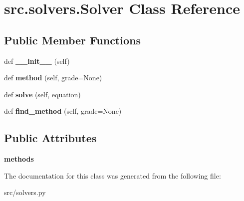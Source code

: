 \hypertarget{classsrc_1_1solvers_1_1Solver}{}\section{src.\+solvers.\+Solver Class Reference}
\label{classsrc_1_1solvers_1_1Solver}
\subsection*{Public Member Functions}
\begin{DoxyCompactItemize}
\item 
\mbox{\label{classsrc_1_1solvers_1_1Solver_a5415ed6863748bdccd46e474367577dd}} 
def {\bfseries \+\_\+\+\_\+init\+\_\+\+\_\+} (self)
\item 
\mbox{\label{classsrc_1_1solvers_1_1Solver_a76ee174069426212316cbbc8c5440db4}} 
def {\bfseries method} (self, grade=None)
\item 
\mbox{\label{classsrc_1_1solvers_1_1Solver_a4bf9eccb3a4ed422f8b74ed43199c023}} 
def {\bfseries solve} (self, equation)
\item 
\mbox{\label{classsrc_1_1solvers_1_1Solver_a9f92c7a01bf90d6218d528f9fabbfedc}} 
def {\bfseries find\+\_\+method} (self, grade=None)
\end{DoxyCompactItemize}
\subsection*{Public Attributes}
\begin{DoxyCompactItemize}
\item 
\mbox{\label{classsrc_1_1solvers_1_1Solver_ac6296ecde06930a25d7c13c2fdea98a7}} 
{\bfseries methods}
\end{DoxyCompactItemize}


The documentation for this class was generated from the following file\+:\begin{DoxyCompactItemize}
\item 
src/solvers.\+py\end{DoxyCompactItemize}
